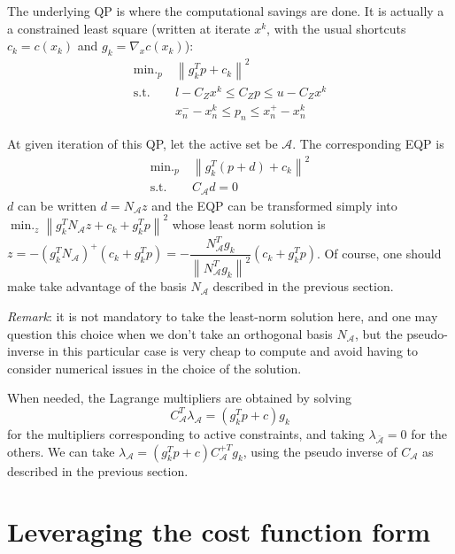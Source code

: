 \documentclass[]{article}
\DeclareMathOperator*{\minimize}{\min.}
\newcommand{\st}{\mbox{s.t.}}
\begin{document}
The underlying QP is where the computational savings are done. It is actually a a constrained least square (written at iterate $x^k$, with the usual shortcuts $c_k = c(x_k)$ and $g_k = \nabla_{x}c(x_k)$):
\begin{align}
  \minimize_p \ & \left\|g_k^T p + c_k\right\|^2 \\
  \st \ & l-C_Z x^k \leq C_Z p \leq u-C_Z x^k \\
        & x_n^- - x^k_n \leq p_n \leq x_n^+ - x^k_n
\end{align}

At given iteration of this QP, let the active set be $\mathcal{A}$. The corresponding EQP is
\begin{align}
  \minimize_p \ & \left\|g_k^T (p+d) + c_k\right\|^2 \\
  \st \ & C_{\mathcal{A}} d = 0
\end{align}
$d$ can be written $d = N_{\mathcal{A}} z$ and the EQP can be transformed simply into $\minimize_z \left\|g_k^T N_{\mathcal{A}}z + c_k + g_k^T p\right\|^2$ whose least norm solution is $z = - (g_k^T N_{\mathcal{A}})^+ (c_k + g_k^T p) = - \dfrac{N_{\mathcal{A}}^T g_k}{\left\|N_{\mathcal{A}}^T g_k\right\|^2}(c_k + g_k^T p)$. Of course, one should make take advantage of the basis $N_{\mathcal{A}}$ described in the previous section.

\emph{Remark}: it is not mandatory to take the least-norm solution here, and one may question this choice when we don't take an orthogonal basis $N_{\mathcal{A}}$, but the pseudo-inverse in this particular case is very cheap to compute and avoid having to consider numerical issues in the choice of the solution.

When needed, the Lagrange multipliers are obtained by solving
\begin{equation}
  C_{\mathcal{A}}^T \lambda_{\mathcal{A}} = (g_k^T p +c) g_k
\end{equation}
for the multipliers corresponding to active constraints, and taking $\lambda_{\bar{\mathcal{A}}} = 0$ for the others. We can take $\lambda_{\mathcal{A}} = (g_k^T p+c) C_{\mathcal{A}}^{+T}g_k$, using the pseudo inverse of $C_{\mathcal{A}}$ as described in the previous section.


\section{Leveraging the cost function form}
\end{document}

